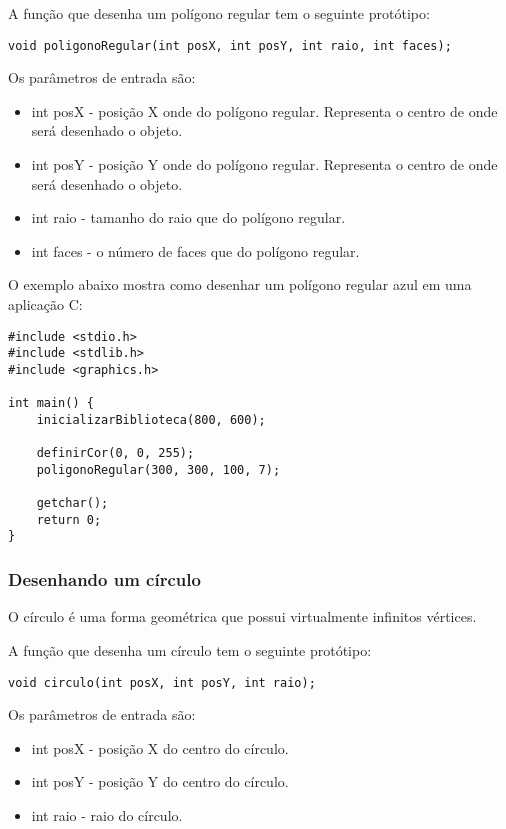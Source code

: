 \documentclass[12pt, %
openright,
oneside, %
a4paper,    %
brazil]{facom-ufu-abntex2}
\begin{document}
A função que desenha um polígono regular tem o seguinte protótipo:

\begin{verbatim}
void poligonoRegular(int posX, int posY, int raio, int faces);
\end{verbatim}

Os parâmetros de entrada são:

\begin{itemize}
    \item int posX - posição X onde do polígono regular. Representa o centro de onde será desenhado o objeto.
    \item int posY - posição Y onde do polígono regular. Representa o centro de onde será desenhado o objeto.
    \item int raio - tamanho do raio que do polígono regular.
    \item int faces - o número de faces que do polígono regular.
\end{itemize}

O exemplo abaixo mostra como desenhar um polígono regular azul em uma aplicação C:

\begin{verbatim}
#include <stdio.h>
#include <stdlib.h>
#include <graphics.h>

int main() {
    inicializarBiblioteca(800, 600);

    definirCor(0, 0, 255);
    poligonoRegular(300, 300, 100, 7);

    getchar();
    return 0;
}
\end{verbatim}

\subsubsection{Desenhando um círculo}
O círculo é uma forma geométrica que possui virtualmente infinitos vértices.

A função que desenha um círculo tem o seguinte protótipo:

\begin{verbatim}
void circulo(int posX, int posY, int raio);
\end{verbatim}

Os parâmetros de entrada são:

\begin{itemize}
    \item int posX - posição X do centro do círculo.
    \item int posY - posição Y do centro do círculo.
    \item int raio - raio do círculo.
\end{itemize}
\end{document}
